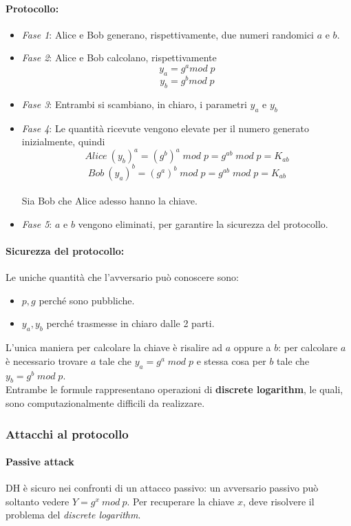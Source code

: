 \documentclass[a4paper,12pt]{article}
\begin{document}
\paragraph{Protocollo:}
\begin{itemize}
	\item \textit{Fase 1}: Alice e Bob generano, rispettivamente, due numeri randomici $a$ e $b$.
	\item \textit{Fase 2}: Alice e Bob calcolano, rispettivamente $$y_a = g^a mod\;p$$ $$y_b = g^b mod\;p$$
	\item \textit{Fase 3}: Entrambi si scambiano, in chiaro, i parametri $y_a$ e $y_b$
	\item \textit{Fase 4}: Le quantità ricevute vengono elevate per il numero generato inizialmente, quindi $$Alice\:(y_b)^a = (g^b)^a\;mod\;p = g^{ab}\;mod\;p = K_{ab}$$ $$Bob\:(y_a)^b = (g^a)^b\;mod\;p = g^{ab}\;mod\;p = K_{ab}$$ \\
	Sia Bob che Alice adesso hanno la chiave.
	\item \textit{Fase 5}: $a$ e $b$ vengono eliminati, per garantire la sicurezza del protocollo.
\end{itemize}
\paragraph{Sicurezza del protocollo:} Le uniche quantità che l'avversario può conoscere sono:
\begin{itemize}
	\item $p,g$ perché sono pubbliche.
	\item $y_a,y_b$ perché trasmesse in chiaro dalle 2 parti.
\end{itemize}
L'unica maniera per calcolare la chiave è risalire ad $a$ oppure a $b$: per calcolare $a$ è necessario trovare
$a$ tale che $y_a = g^a\;mod\;p$ e stessa cosa per $b$ tale che $y_b = g^b\;mod\;p$. \\
Entrambe le formule rappresentano operazioni di \textbf{discrete logarithm}, le quali, sono computazionalmente difficili da realizzare.

\subsubsection{Attacchi al protocollo}

\paragraph{Passive attack}
DH è sicuro nei confronti di un attacco passivo: un avversario passivo può soltanto vedere $Y = g^x\ mod\ p$. Per recuperare la chiave $x$, deve risolvere il problema del \textit{discrete logarithm}.
\end{document}
